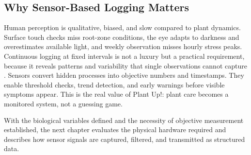 \subsection{Why Sensor-Based Logging Matters}

Human perception is qualitative, biased, and slow compared to plant dynamics. Surface touch checks miss root-zone conditions, the eye adapts to darkness and overestimates available light, and weekly observation misses hourly stress peaks. \cite{usuOverwatering, pittLightAdaptation} Continuous logging at fixed intervals is not a luxury but a practical requirement, because it reveals patterns and variability that single observations cannot capture \cite{blancaflor2025measuring}.
Sensors convert hidden processes into objective numbers and timestamps. They enable threshold checks, trend detection, and early warnings before visible symptoms appear. This is the real value of Plant Up!: plant care becomes a monitored system, not a guessing game.

With the biological variables defined and the necessity of objective measurement established, the next chapter evaluates the physical hardware required and describes how sensor signals are captured, filtered, and transmitted as structured data.
